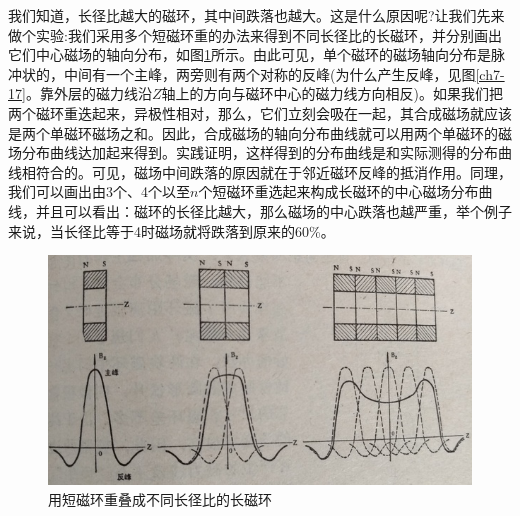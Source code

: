 我们知道，长径比越大的磁环，其中间跌落也越大。这是什么原因呢?让我们先来做个实验:我们采用多个短磁环重的办法来得到不同长径比的长磁环，并分别画出它们中心磁场的轴向分布，如图\ref{ch7-15}所示。由此可见，单个磁环的磁场轴向分布是脉冲状的，中间有一个主峰，两旁则有两个对称的反峰(为什么产生反峰，见图\ref{ch7-17}。靠外层的磁力线沿$ Z $轴上的方向与磁环中心的磁力线方向相反)。如果我们把两个磁环重迭起来，异极性相对，那么，它们立刻会吸在一起，其合成磁场就应该是两个单磁环磁场之和。因此，合成磁场的轴向分布曲线就可以用两个单磁环的磁场分布曲线达加起来得到。实践证明，这样得到的分布曲线是和实际测得的分布曲线相符合的。可见，磁场中间跌落的原因就在于邻近磁环反峰的抵消作用。同理，我们可以画出由3个、4个以至$ n $个短磁环重选起来构成长磁环的中心磁场分布曲线，并且可以看出：磁环的长径比越大，那么磁场的中心跌落也越严重，举个例子来说，当长径比等于4时磁场就将跌落到原来的60\%。
\begin{figure}[phtb]
	\centering
	\includegraphics[width=0.65\linewidth]{figure/ch7-15}
	\caption{用短磁环重叠成不同长径比的长磁环}
	\label{ch7-15}
\end{figure}

